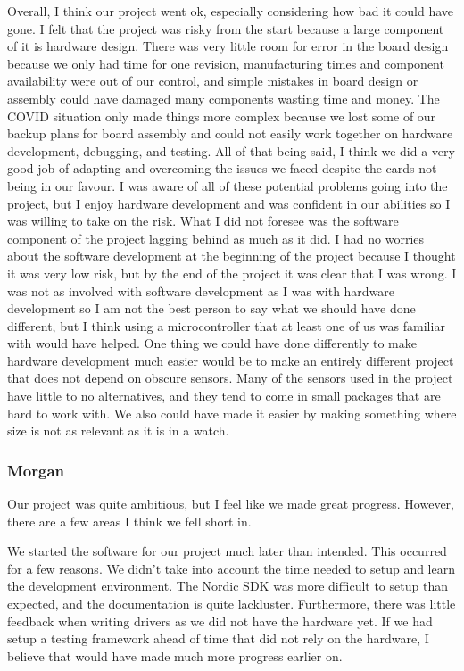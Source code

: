 Overall, I think our project went ok, especially considering how bad it could
have gone. I felt that the project was risky from the start because a large
component of it is hardware design. There was very little room for error in the
board design because we only had time for one revision, manufacturing times
and component availability were out of our control, and simple mistakes in board 
design or assembly could have damaged many components wasting time and money. 
The COVID situation only made things more complex because we lost some of our 
backup plans for board assembly and could not easily work together on hardware 
development, debugging, and testing. All of that being said, I think we did a 
very good job of adapting and overcoming the issues we faced despite the cards 
not being in our favour. I was aware of all of these potential problems going
into the project, but I enjoy hardware development and was confident in our 
abilities so I was willing to take on the risk. What I did not foresee was the
software component of the project lagging behind as much as it did. I had no
worries about the software development at the beginning of the project 
because I thought it was very low risk, but by the end of the project it was
clear that I was wrong. I was not as involved with software development as I was
with hardware development so I am not the best person to say what we should 
have done different, but I think using a microcontroller that at least one of us
was familiar with would have helped. One thing we could have done differently to 
make hardware development much easier would be to make an entirely different 
project that does not depend on obscure sensors. Many of the sensors used in the 
project have little to no alternatives, and they tend to come in small packages 
that are hard to work with. We also could have made it easier by making 
something where size is not as relevant as it is in a watch.

\subsubsection{Morgan}

Our project was quite ambitious, but I feel like we made great progress.
However, there are a few areas I think we fell short in.

We started the software for our project much later than intended.  This
occurred for a few reasons.  We didn't take into account the time needed to
setup and learn the development environment.  The Nordic SDK was more difficult
to setup than expected, and the documentation is quite lackluster.
Furthermore, there was little feedback when writing drivers as we did not have
the hardware yet.  If we had setup a testing framework ahead of time that did
not rely on the hardware, I believe that would have made much more progress
earlier on.

